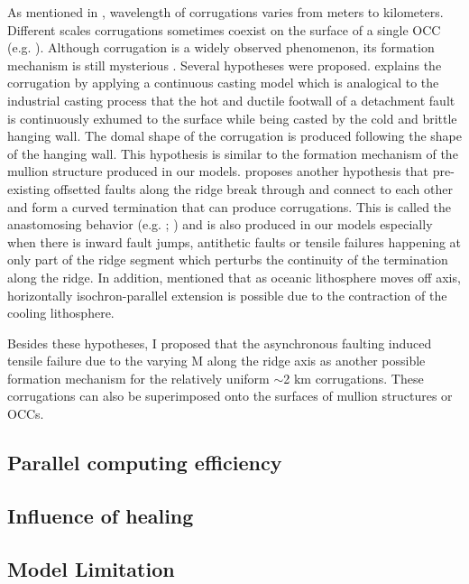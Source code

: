 As mentioned in \citep{Smith2014}, wavelength of corrugations varies from meters to kilometers. Different scales corrugations sometimes coexist on the surface of a single OCC (e.g. \citealp{MacLeod2009}). Although corrugation is a widely observed phenomenon, its formation mechanism is still mysterious \citep{Smith2006}. Several hypotheses were proposed. \citet{Spencer1999} explains the corrugation by applying a continuous casting model which is analogical to the industrial casting process that the hot and ductile footwall of a detachment fault is continuously exhumed to the surface while being casted by the cold and brittle hanging wall. The domal shape of the corrugation is produced following the shape of the hanging wall. This hypothesis is similar to the formation mechanism of the mullion structure produced in our models. \citet{Smith2014} proposes another hypothesis that pre-existing offsetted faults along the ridge break through and connect to each other and form a curved termination that can produce corrugations. This is called the anastomosing behavior (e.g. \citealp{Ferrill1999}; \citealp{Wong2008}) and is also produced in our models especially when there is inward fault jumps, antithetic faults or tensile failures happening at only part of the ridge segment which perturbs the continuity of the termination along the ridge. In addition, \citet{Tucholke1998} mentioned that %
as oceanic lithosphere moves off axis, horizontally isochron-parallel extension is possible due to the contraction of the cooling lithosphere.

Besides these hypotheses, I proposed that the asynchronous faulting induced tensile failure due to the varying M along the ridge axis as another possible formation mechanism for the relatively uniform $\sim$2 km corrugations. These corrugations can also be superimposed onto the surfaces of mullion structures or OCCs.

\iffalse
\subsection{Parallel computing efficiency}
\subsection{Influence of healing}
\subsection{Model Limitation}
